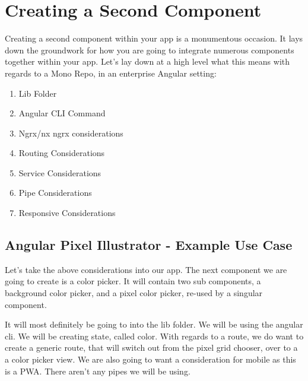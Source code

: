 \maketitle{}
\section{ Creating a Second Component }
Creating a second component within your app is a monumentous occasion. It lays
down the groundwork for how you are going to integrate numerous components
together within your app. Let's lay down at a high level what this means with
regards to a Mono Repo, in an enterprise Angular setting:

\begin{enumerate}
  \item Lib Folder
  \item Angular CLI Command
  \item Ngrx/nx ngrx considerations
  \item Routing Considerations
  \item Service Considerations
  \item Pipe Considerations
  \item Responsive Considerations
\end{enumerate}

\subsection{ Angular Pixel Illustrator - Example Use Case }
Let's take the above considerations into our app. The next component we are
going to create is a color picker. It will contain two sub components, a
background color picker, and a pixel color picker, re-used by a singular
component.

It will most definitely be going to into the lib folder. We will be using the
angular cli. We will be creating state, called color. With regards to a route,
we do want to create a generic route, that will switch out from the pixel grid
chooser, over to a a color picker view. We are also going to want a
consideration for mobile as this is a PWA. There aren't any pipes we will be
using.

